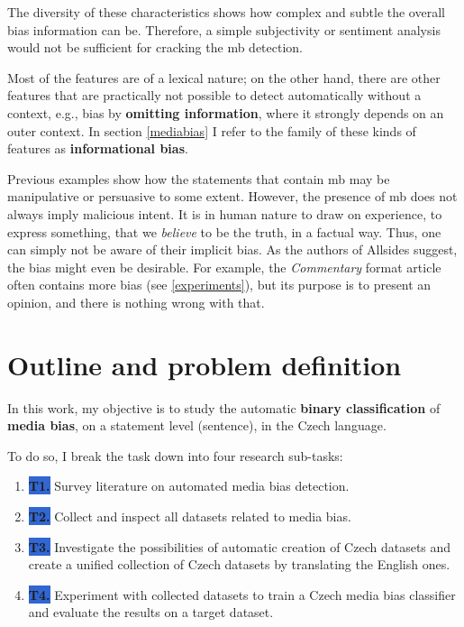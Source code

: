 The diversity of these characteristics shows how complex and subtle the overall bias information can be. Therefore, a simple subjectivity or sentiment analysis would not be sufficient for cracking the \gls{mb} detection. 

Most of the features are of a lexical nature; on the other hand, there are other features that are practically not possible to detect automatically without a context, e.g., bias by \textbf{omitting information}, where it strongly depends on an outer context. In section \ref{mediabias} I refer to the family of these kinds of features as \textbf{informational bias}.


Previous examples show how the statements that contain \gls{mb} may be manipulative or persuasive to some extent. However, the presence of \gls{mb} does not always imply malicious intent. It is in human nature to draw on experience, to express something, that we \textit{believe} to be the truth, in a factual way. Thus, one can simply not be aware of their implicit bias. As the authors of Allsides suggest, the bias might even be desirable. For example, the \textit{Commentary} format article often contains more bias (see \ref{experiments}), but its purpose is to present an opinion, and there is nothing wrong with that.



\section{Outline and problem definition}\label{problem_definition}
In this work, my objective is to study the automatic \textbf{binary classification} of \textbf{media bias}, on a statement level (sentence), in the Czech language.

 To do so, I break the task down into four research sub-tasks:
 \begin{enumerate}
     \item[] \colorbox{highlight}{\textbf{T1.}\label{T1}} Survey literature on automated media bias detection.
     \item[] \colorbox{highlight}{\textbf{T2.}\label{T2}} Collect and inspect all datasets related to media bias.
     \item[] \colorbox{highlight}{\textbf{T3.}\label{T3}} Investigate the possibilities of automatic creation of Czech datasets and create a unified collection of Czech datasets by translating the English ones.
     \item[] \colorbox{highlight}{\textbf{T4.}\label{T4}} Experiment with collected datasets to train a Czech media bias classifier and evaluate the results on a target dataset.
 \end{enumerate}
 

